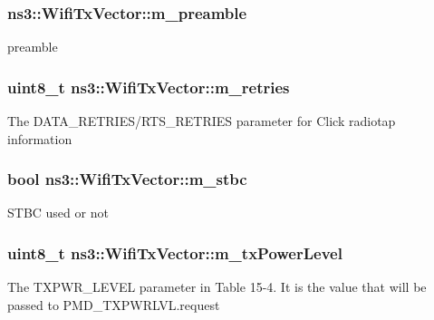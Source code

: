 \subsubsection[{\texorpdfstring{m\+\_\+preamble}{m_preamble}}]{ ns3\+::\+Wifi\+Tx\+Vector\+::m\+\_\+preamble\hspace{0.3cm}{\ttfamily [private]}}\hypertarget{classns3_1_1WifiTxVector_ad53c8038c1039f47e8a1c3ab45d4454f}{}\label{classns3_1_1WifiTxVector_ad53c8038c1039f47e8a1c3ab45d4454f}
preamble 
\subsubsection[{\texorpdfstring{m\+\_\+retries}{m_retries}}]{\setlength{\rightskip}{0pt plus 5cm}uint8\+\_\+t ns3\+::\+Wifi\+Tx\+Vector\+::m\+\_\+retries\hspace{0.3cm}{\ttfamily [private]}}\hypertarget{classns3_1_1WifiTxVector_a4385bff218d8d930fd9ba8f59523d8c2}{}\label{classns3_1_1WifiTxVector_a4385bff218d8d930fd9ba8f59523d8c2}
The D\+A\+T\+A\+\_\+\+R\+E\+T\+R\+I\+E\+S/\+R\+T\+S\+\_\+\+R\+E\+T\+R\+I\+ES parameter for Click radiotap information 
\subsubsection[{\texorpdfstring{m\+\_\+stbc}{m_stbc}}]{\setlength{\rightskip}{0pt plus 5cm}bool ns3\+::\+Wifi\+Tx\+Vector\+::m\+\_\+stbc\hspace{0.3cm}{\ttfamily [private]}}\hypertarget{classns3_1_1WifiTxVector_a8095c19f9f243d9376a6eb154fdc1c12}{}\label{classns3_1_1WifiTxVector_a8095c19f9f243d9376a6eb154fdc1c12}
S\+T\+BC used or not 
\subsubsection[{\texorpdfstring{m\+\_\+tx\+Power\+Level}{m_txPowerLevel}}]{\setlength{\rightskip}{0pt plus 5cm}uint8\+\_\+t ns3\+::\+Wifi\+Tx\+Vector\+::m\+\_\+tx\+Power\+Level\hspace{0.3cm}{\ttfamily [private]}}\hypertarget{classns3_1_1WifiTxVector_a771bae5fd1bd8f8df1f0b172946e9469}{}\label{classns3_1_1WifiTxVector_a771bae5fd1bd8f8df1f0b172946e9469}
The T\+X\+P\+W\+R\+\_\+\+L\+E\+V\+EL parameter in Table 15-\/4. It is the value that will be passed to P\+M\+D\+\_\+\+T\+X\+P\+W\+R\+L\+V\+L.\+request 
